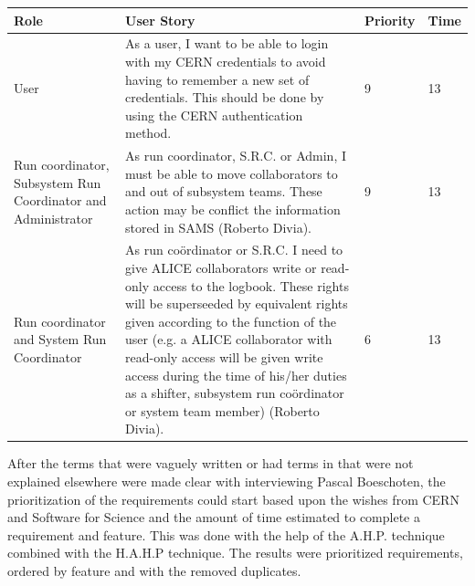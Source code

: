 \documentclass[paper=a4, fontsize=11pt,twoside]{scrartcl}	%
\begin{document}
\begin{longtable}{ | p{3cm} | p{8cm} | p{1.5cm} | l |}
\hline
Role & User Story & Priority & Time \\ \hline
User & As a user, I want to be able to login with my CERN credentials to avoid having to remember a new set of credentials. This should be done by using the CERN authentication method. & 9 & 13 \\ \hline
Run coordinator, Subsystem Run Coordinator and Administrator &  As run coordinator, S.R.C. or Admin, I must be able to move collaborators to and out of subsystem teams. These action may be conflict the information stored in SAMS (Roberto Divia). & 9 & 13 \\ \hline
Run coordinator and System Run Coordinator &  As run coördinator or S.R.C. I need to give ALICE collaborators write or read-only access to the logbook. These rights will be superseeded by equivalent rights given according to the function of the user (e.g. a ALICE collaborator with read-only access will be given write access during the time of his/her duties as a shifter, subsystem run coördinator or system team member) (Roberto Divia).&6&13 \\ \hline
\end{longtable}

After the terms that were vaguely written or had terms in that were not explained elsewhere were made clear with interviewing Pascal Boeschoten, the prioritization of the requirements could start based upon the wishes from CERN and Software for Science and the amount of time estimated to complete a requirement and feature. This was done with the help of the A.H.P. technique combined with the H.A.H.P technique. The results were prioritized requirements, ordered by feature and with the removed duplicates. 
\newpage
\end{document}
